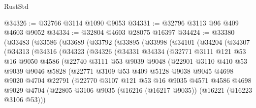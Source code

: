 \begin{lexlean}{RustStd}
\begin{coremodule}
@34326 := @32766 @3114 @1090 @9053
@34331 := @32796 @3113 @96 @409 @4603 @9052
@34334 := @32804 @4603 @28075 @16397
@34424 := @33380
    (@33483
      (@33586
        (@33689
          (@33792
            (@33895
              (@33998
                (@34101
                  (@34204
                    (@34307
                      (@34313
                        (@34316
                          (@34323
                            (@34326
                              (@34331
                                @34334
                                (@32771
                                  @3111
                                  @121
                                  @53
                                  @16
                                  @9050
                                  @4586
                                  (@22740
                                    @3111
                                    @53
                                    @9039
                                    @9048
                                    (@22901
                                      @3110
                                      @410
                                      @53
                                      @9039
                                      @9046
                                      @5828
                                      (@22771
                                        @3109
                                        @53
                                        @409
                                        @5128
                                        @9038
                                        @9045
                                        @4698
                                        @9020
                                        @4704
                                        @22791
                                        (@22770
                                          @3107
                                          @121
                                          @53
                                          @16
                                          @9035
                                          @4571
                                          @4586
                                          @4698
                                          @9029
                                          @4704
                                          (@22805
                                            @3106
                                            @9035
                                            (@16216 (@16217 @9035))
                                            (@16221 (@16223 @3106 @53)))

\end{coremodule}
\end{lexlean}

